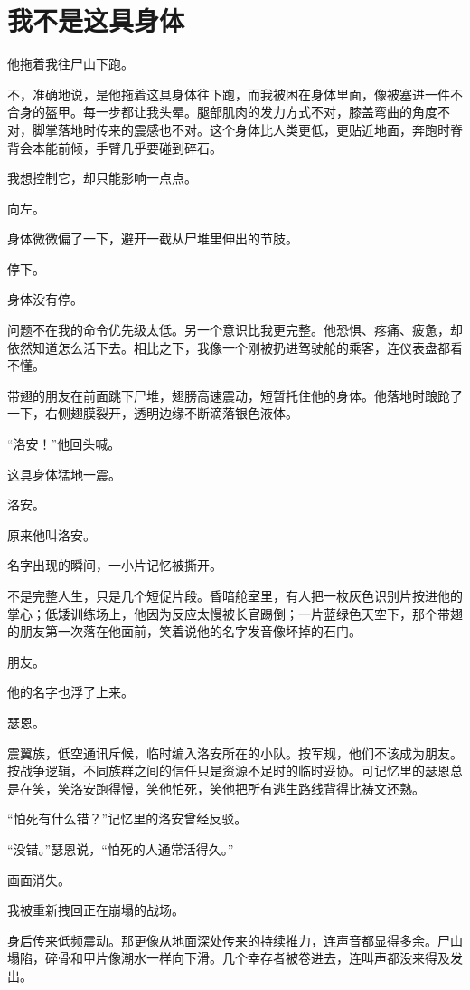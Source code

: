 \chapter{我不是这具身体}

他拖着我往尸山下跑。

不，准确地说，是他拖着这具身体往下跑，而我被困在身体里面，像被塞进一件不合身的盔甲。每一步都让我头晕。腿部肌肉的发力方式不对，膝盖弯曲的角度不对，脚掌落地时传来的震感也不对。这个身体比人类更低，更贴近地面，奔跑时脊背会本能前倾，手臂几乎要碰到碎石。

我想控制它，却只能影响一点点。

向左。

身体微微偏了一下，避开一截从尸堆里伸出的节肢。

停下。

身体没有停。

问题不在我的命令优先级太低。另一个意识比我更完整。他恐惧、疼痛、疲惫，却依然知道怎么活下去。相比之下，我像一个刚被扔进驾驶舱的乘客，连仪表盘都看不懂。

带翅的朋友在前面跳下尸堆，翅膀高速震动，短暂托住他的身体。他落地时踉跄了一下，右侧翅膜裂开，透明边缘不断滴落银色液体。

“洛安！”他回头喊。

这具身体猛地一震。

洛安。

原来他叫洛安。

名字出现的瞬间，一小片记忆被撕开。

不是完整人生，只是几个短促片段。昏暗舱室里，有人把一枚灰色识别片按进他的掌心；低矮训练场上，他因为反应太慢被长官踢倒；一片蓝绿色天空下，那个带翅的朋友第一次落在他面前，笑着说他的名字发音像坏掉的石门。

朋友。

他的名字也浮了上来。

瑟恩。

震翼族，低空通讯斥候，临时编入洛安所在的小队。按军规，他们不该成为朋友。按战争逻辑，不同族群之间的信任只是资源不足时的临时妥协。可记忆里的瑟恩总是在笑，笑洛安跑得慢，笑他怕死，笑他把所有逃生路线背得比祷文还熟。

“怕死有什么错？”记忆里的洛安曾经反驳。

“没错。”瑟恩说，“怕死的人通常活得久。”

画面消失。

我被重新拽回正在崩塌的战场。

身后传来低频震动。那更像从地面深处传来的持续推力，连声音都显得多余。尸山塌陷，碎骨和甲片像潮水一样向下滑。几个幸存者被卷进去，连叫声都没来得及发出。

